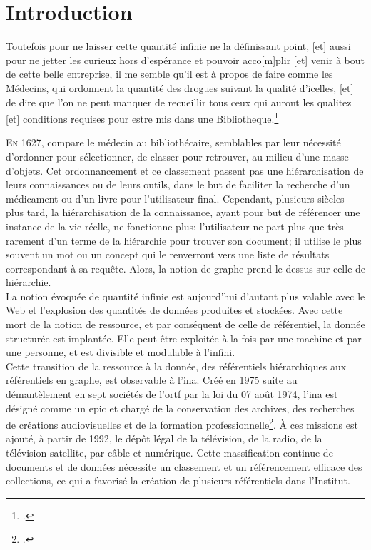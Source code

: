 	\chapter*{\label{introduction_generale}Introduction}

\begin{citationLongue}
	Toutefois pour ne laisser cette quantité infinie ne la définissant point, [et] aussi pour ne jetter les curieux hors d'espérance et pouvoir acco[m]plir [et] venir à bout de cette belle entreprise, il me semble qu'il est à propos de faire comme les Médecins, qui ordonnent la quantité des drogues suivant la qualité d'icelles, [et] de dire que l'on ne peut manquer de recueillir tous ceux qui auront les qualitez [et] conditions requises pour estre mis dans une Bibliotheque.\footcite[p.41-42]{naude_advis_1627}
\end{citationLongue}


\lettrine{E}n 1627,  compare le médecin au bibliothécaire, semblables par leur nécessité d'ordonner pour sélectionner, de classer pour retrouver, au milieu d'une masse d'objets. Cet ordonnancement et ce classement passent pas une hiérarchisation de leurs connaissances ou de leurs outils, dans le but de faciliter la recherche d'un médicament ou d'un livre pour l'utilisateur final. Cependant, plusieurs siècles plus tard, la hiérarchisation de la connaissance, ayant pour but de référencer une instance de la vie réelle, ne fonctionne plus: l'utilisateur ne part plus que très rarement d'un terme de la hiérarchie pour trouver son document; il utilise le plus souvent un mot ou un concept qui le renverront vers une liste de résultats correspondant à sa requête. Alors, la notion de graphe prend le dessus sur celle de hiérarchie.\\

La notion évoquée de \og quantité infinie \fg{} est aujourd'hui d'autant plus valable avec le Web et l'explosion des quantités de données produites et stockées. Avec cette mort de la notion de ressource, et par conséquent de celle de référentiel, la donnée structurée est implantée. Elle peut être exploitée à la fois par une machine et par une personne, et est divisible et modulable à l'infini.\\

Cette transition de la ressource à la donnée, des référentiels hiérarchiques aux référentiels en graphe, est observable à l'\ac{ina}. Créé en 1975 suite au démantèlement en sept sociétés de l'\ac{ortf} par la loi du 07 août 1974, l'\ac{ina} est désigné comme un \ac{epic} et \og chargé de la conservation des archives, des recherches de créations audiovisuelles et de la formation professionnelle\fg{}\footcite[art.3]{noauthor_loi_1974}. À ces missions est ajouté, à partir de 1992, le dépôt légal de la télévision, de la radio, de la télévision satellite, par câble et numérique. Cette massification continue de documents et de données nécessite un classement et un référencement efficace des collections, ce qui a favorisé la création de plusieurs référentiels dans l'Institut.\\

